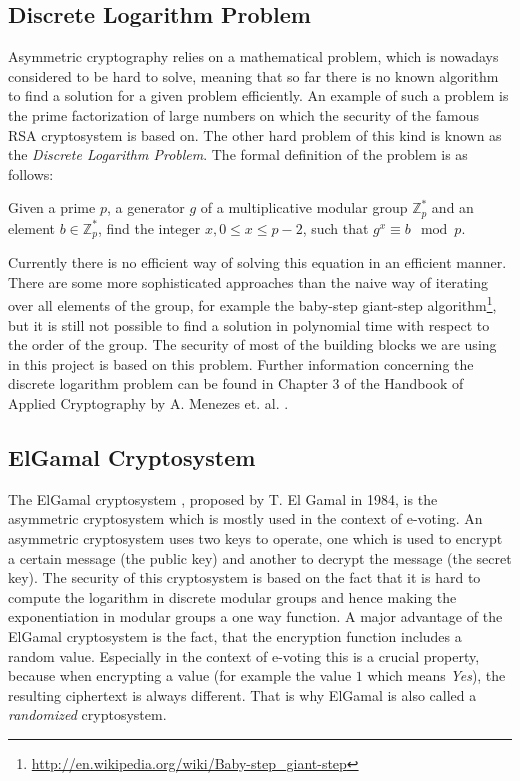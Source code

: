 \documentclass[numbers=noenddot, abstract=on, a4paper, headsepline,
footsepline, oneside, draft=off]{scrreprt}
\begin{document}
\subsection{Discrete Logarithm Problem}
\label{sec:discretelogarithm}
Asymmetric cryptography relies on a mathematical problem, which is nowadays
considered to be hard to solve, meaning that so far there is no known algorithm
to find a solution for a given problem efficiently. An example of such a problem
is the prime factorization of large numbers on which the security of the famous
RSA cryptosystem \cite{RSA78} is based on. The other hard problem of this kind
is known as the \emph{Discrete Logarithm Problem}. The formal definition of
the problem is as follows: 

Given a prime $p$, a generator $g$ of a multiplicative modular group
$\mathbb{Z}^*_p$ and an element $b \in \mathbb{Z}^*_p$, find the integer $x,0
\leq x \leq p - 2$, such that $g^x \equiv b \mod p$.

Currently there is no efficient way of solving this equation in an efficient
manner. There are some more sophisticated approaches than the naive way of
iterating over all elements of the group, for example the baby-step giant-step
algorithm\footnote{\url{http://en.wikipedia.org/wiki/Baby-step_giant-step}}, but
it is still not possible to find a solution in polynomial time with respect to
the order of the group. The security of most of the building blocks we are using
in this project is based on this problem. Further information concerning the
discrete logarithm problem can be found in Chapter 3 of the Handbook of Applied
Cryptography by A. Menezes et. al.
\cite{book:hac}.

\subsection{ElGamal Cryptosystem}
\label{sec:elgamal}
The ElGamal cryptosystem \cite{EG84}, proposed by T. El Gamal in 1984, is the
asymmetric cryptosystem which is mostly used in the context of e-voting. An
asymmetric cryptosystem uses two keys to operate, one which is used to encrypt a
certain message (the public key) and another to decrypt the message (the secret
key). The security of this cryptosystem is based on the fact that it is hard to
compute the logarithm in discrete modular groups and hence making the
exponentiation in modular groups a one way function. A major advantage of the
ElGamal cryptosystem is the fact, that the encryption function includes a random
value. Especially in the context of e-voting this is a crucial property, because
when encrypting a value (for example the value $1$ which means \textit{Yes}),
the resulting ciphertext is always different. That is why ElGamal is also called
a \textit{randomized} cryptosystem.
\end{document}

